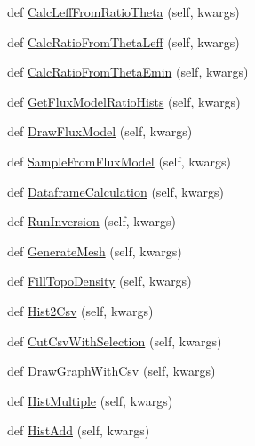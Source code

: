 \begin{DoxyCompactItemize}
\item 
def \hyperlink{classMIS_1_1DataFactory_1_1DataManager_1_1DataManager_aaf1e960fed082c7d8cf0d3e4aa5157c2}{Calc\+Leff\+From\+Ratio\+Theta} (self, kwargs)
\item 
def \hyperlink{classMIS_1_1DataFactory_1_1DataManager_1_1DataManager_a685c873207f6bbcbc995846aecdc4374}{Calc\+Ratio\+From\+Theta\+Leff} (self, kwargs)
\item 
def \hyperlink{classMIS_1_1DataFactory_1_1DataManager_1_1DataManager_af12ae85b0edb3d26aa318bee7dd71562}{Calc\+Ratio\+From\+Theta\+Emin} (self, kwargs)
\item 
def \hyperlink{classMIS_1_1DataFactory_1_1DataManager_1_1DataManager_a9e2f34dcdc7f48da50441394f290979a}{Get\+Flux\+Model\+Ratio\+Hists} (self, kwargs)
\item 
def \hyperlink{classMIS_1_1DataFactory_1_1DataManager_1_1DataManager_a9cf982a7b3b38af35610114ebba6b57c}{Draw\+Flux\+Model} (self, kwargs)
\item 
def \hyperlink{classMIS_1_1DataFactory_1_1DataManager_1_1DataManager_a0408d2bf7ded40c02e4179a03a73d0a8}{Sample\+From\+Flux\+Model} (self, kwargs)
\item 
def \hyperlink{classMIS_1_1DataFactory_1_1DataManager_1_1DataManager_aa82afa3abfc74cc26d93f0bba214afdb}{Dataframe\+Calculation} (self, kwargs)
\item 
def \hyperlink{classMIS_1_1DataFactory_1_1DataManager_1_1DataManager_aa014ab1564104265eff426ca085b1460}{Run\+Inversion} (self, kwargs)
\item 
def \hyperlink{classMIS_1_1DataFactory_1_1DataManager_1_1DataManager_a94176bcc4c3de7974b29e1e1a2396de8}{Generate\+Mesh} (self, kwargs)
\item 
def \hyperlink{classMIS_1_1DataFactory_1_1DataManager_1_1DataManager_aac5857fc8804eb3cd475ecafbce69d5c}{Fill\+Topo\+Density} (self, kwargs)
\item 
def \hyperlink{classMIS_1_1DataFactory_1_1DataManager_1_1DataManager_a6f3e7e3e011e1af4ab56820bf3614afe}{Hist2\+Csv} (self, kwargs)
\item 
def \hyperlink{classMIS_1_1DataFactory_1_1DataManager_1_1DataManager_a4bb374858559d80933c6695d41c74e85}{Cut\+Csv\+With\+Selection} (self, kwargs)
\item 
def \hyperlink{classMIS_1_1DataFactory_1_1DataManager_1_1DataManager_aa37fa557f917d8a8808cfa3b6b60d791}{Draw\+Graph\+With\+Csv} (self, kwargs)
\item 
def \hyperlink{classMIS_1_1DataFactory_1_1DataManager_1_1DataManager_a7c3a7bdfdb03ed34ce975a31786caefe}{Hist\+Multiple} (self, kwargs)
\item 
def \hyperlink{classMIS_1_1DataFactory_1_1DataManager_1_1DataManager_a21a542fad5f5d72d66b3a09b0a1bcd4a}{Hist\+Add} (self, kwargs)
\end{DoxyCompactItemize}


